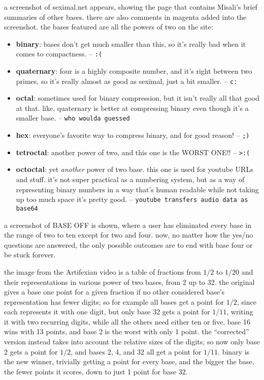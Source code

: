 \documentclass[../footnotes.tex]{subfiles}
\begin{document}
 a screenshot of seximal.net appears, showing the page that contains Misali's brief summaries of other bases. there are also comments in magenta added into the screenshot. the bases featured are all the powers of two on the site:

\begin{itemize}
	\item {\bf binary}: bases don't get much smaller than this, so it's really bad when it comes to compactness. -- {\tt :(}
	\item {\bf quaternary}: four is a highly composite number, and it's right between two primes, so it's really almost as good as seximal, just a bit smaller. -- {\tt c:}
	\item {\bf octal}: sometimes used for binary compression, but it isn't really all that good at that. like, quaternary is better at compressing binary even though it's a smaller base. -- {\tt who woulda guessed}
	\item {\bf hex}: everyone's favorite way to compress binary, and for good reason! -- {\tt ;)}
	\item {\bf tetroctal}: another power of two, and this one is the WORST ONE!! -- {\tt >:(}
	\item {\bf octoctal}: yet \emph{another} power of two base. this one is used for youtube URLs and stuff. it’s not super practical as a numbering system, but as a way of representing binary numbers in a way that's human readable while not taking up too much space it's pretty good. -- {\tt youtube transfers audio data as base64}
\end{itemize}

 a screenshot of BASE OFF is shown, where a user has eliminated every base in the range of two to ten except for two and four. now, no matter how the yes/no questions are answered, the only possible outcomes are to end with base four or be stuck forever.

 the image from the Artifexian video is a table of fractions from $1/2$ to $1/20$ and their representations in various power of two bases, from 2 up to 32. the original gives a base one point for a given fraction if no other considered base's representation has fewer digits; so for example all bases get a point for $1/2$, since each represents it with one digit, but only base 32 gets a point for $1/11$, writing it with two recurring digits, while all the others need either ten or five. base 16 wins with 13 points, and base 2 is the worst with only 1 point. the ``corrected'' version instead takes into account the relative sizes of the digits; so now only base 2 gets a point for $1/2$, and bases 2, 4, and 32 all get a point for $1/11$. binary is the new winner, trivially getting a point for every base, and the bigger the base, the fewer points it scores, down to just 1 point for base 32.
\end{document}
